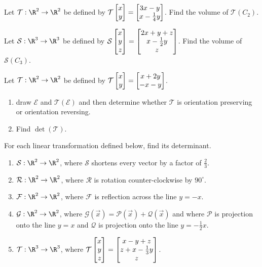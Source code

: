 \begin{exercises}
	\begin{problist}
		\prob Let $\mathcal T:\R^{2}\to\R^{2}$ be defined by
		$\mathcal T\mat{x\\y}=\matc{3x-y\\x-\tfrac{1}{4}y}$. Find the volume
		of $\mathcal T(C_{2})$.

		\prob Let $\mathcal S:\R^{3}\to\R^{3}$ be defined by
		$\mathcal S\mat{x\\y\\z}=\matc{2x+y+z\\x-\tfrac{1}{2}y\\z}$. Find
		the volume of $\mathcal S(C_{3})$.

		\prob Let $\mathcal T:\R^{2}\to\R^{2}$ be defined by
		$\mathcal T\mat{x\\y}=\matc{x+2y\\-x-y}$.
		\begin{enumerate}
			\item draw $\mathcal{E}$ and $\mathcal{T}(\mathcal{E})$ and
				then determine whether $\mathcal{T}$ is orientation
				preserving or orientation reversing.

			\item Find $\det(\mathcal T)$.
		\end{enumerate}

		\prob For each linear transformation defined below, find its
		determinant.
		\begin{enumerate}
			\item $\mathcal S:\R^{2}\to\R^{2}$, where $\mathcal S$
				shortens
				every vector by a factor of $\tfrac{2}{3}$.

			\item $\mathcal R:\R^{2}\to\R^{2}$, where $\mathcal R$
				is rotation counter-clockwise by $90^{\circ}$.

			\item $\mathcal F:\R^{2}\to\R^{2}$, where $\mathcal F$
				is reflection across the line $y=-x$.

			\item $\mathcal G:\R^{2}\to\R^{2}$, where
				$\mathcal G(\vec x)=\mathcal{P}(\vec x)+
				\mathcal{Q}(\vec x)$ and where $\mathcal{P}$ is projection onto the
				line $y=x$ and $\mathcal{Q}$ is projection onto
				the line $y=-\tfrac{1}{2}x$.

			\item $\mathcal T:\R^{3}\to\R^{3}$, where
				$\mathcal T\mat{x\\y\\z}=\matc{x-y+z\\z+x-\tfrac{1}{3}y\\z}$.


\end{enumerate}
\end{problist}
\end{exercises}
